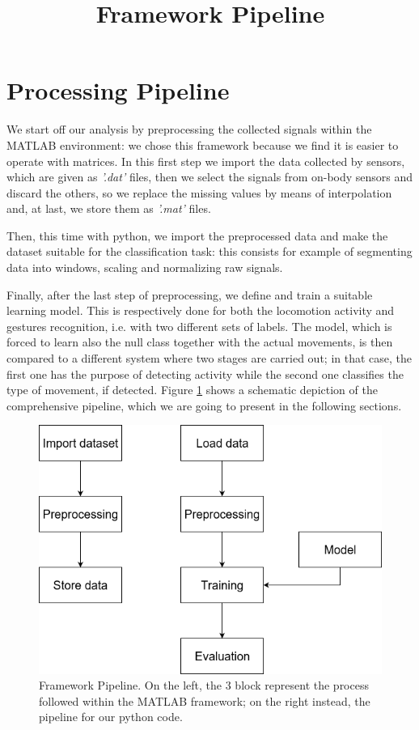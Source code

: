 
\section{Processing Pipeline}
\label{sec:processing_architecture}

We start off our analysis by preprocessing the collected signals within the MATLAB environment: we chose this framework because we find it is easier to operate with matrices. In this first step we import the data collected by sensors, which are given as \textit{'.dat'} files, then we select the signals from on-body sensors and discard the others, so we replace the missing values by means of interpolation and, at last, we store them as \textit{'.mat'} files.

Then, this time with python, we import the preprocessed data and make the dataset suitable for the classification task: this consists for example of segmenting data into windows, scaling and normalizing raw signals.

Finally, after the last step of preprocessing, we define and train a suitable learning model. This is respectively done for both the locomotion activity and gestures recognition, i.e. with two different sets of labels. The model, which is forced to learn also the null class together with the actual movements, is then compared to a different system where two stages are carried out; in that case, the first one has the purpose of detecting activity while the second one classifies the type of movement, if detected. Figure \ref{fig:pipeline} shows a schematic depiction of the comprehensive pipeline, which we are going to present in the following sections.

\begin{figure}[ht]
	\centering
	\includegraphics[scale=.4]{figure/block_diag}
	\title{Framework Pipeline}
	\caption{Framework Pipeline. On the left, the 3 block represent the process followed within the MATLAB framework; on the right instead, the pipeline for our python code.}
	\label{fig:pipeline}
\end{figure}

